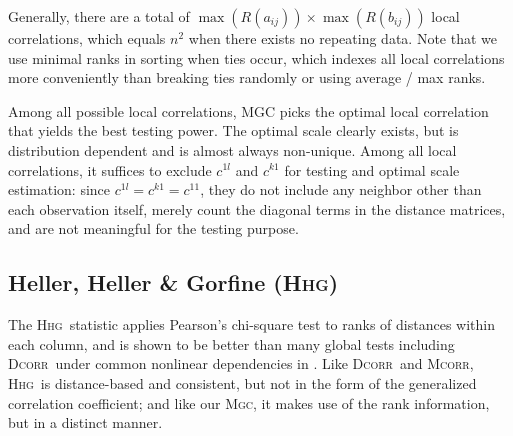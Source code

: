 \documentclass[11pt]{article}
\providecommand{\sct}[1]{{\normalfont\textsc{#1}}}
\newcommand{\G}{c}
\newcommand{\Mgc}{\sct{Mgc}}
\newcommand{\Hhg}{\sct{Hhg}}
\newcommand{\Dcorr}{\sct{Dcorr}}
\newcommand{\Mcorr}{\sct{Mcorr}}
\begin{document}
Generally, there are a total of $\max(R(a_{ij})) \times \max(R(b_{ij}))$ local correlations, which equals $n^2$ when there exists no repeating data. Note that we use minimal ranks in sorting when ties occur, which indexes all local correlations more conveniently than breaking ties randomly or using average / max ranks.

Among all possible local correlations, MGC picks the optimal local correlation that yields the best testing power. The optimal scale clearly exists, but is distribution dependent and is almost always non-unique. Among all local correlations, it suffices to exclude $\G^{1l}$ and $\G^{k1}$ for testing and optimal scale estimation: since $\G^{1l}=\G^{k1}=\G^{11}$, they do not include any neighbor other than each observation itself, merely count the diagonal terms in the distance matrices, and are not meaningful for the testing purpose.


\subsection{Heller, Heller \& Gorfine (\Hhg)}
\label{appen:hhg}
The \Hhg~statistic applies Pearson's chi-square test to ranks of distances within each column, and is shown to be better than many global tests including \Dcorr~under common nonlinear dependencies in \cite{GorfineHellerHeller2012, HellerGorfine2013}. Like \Dcorr~and \Mcorr, \Hhg~is distance-based and consistent, but not in the form of the generalized correlation coefficient; and like our \Mgc, it makes use of the rank information, but in a distinct manner.
\end{document}
